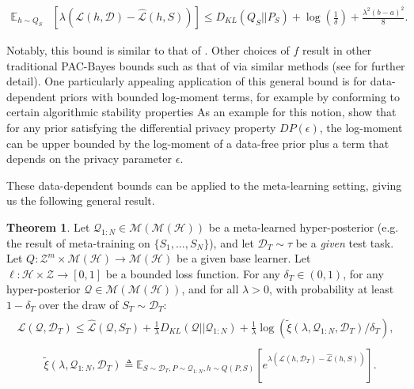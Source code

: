 \documentclass{article} %
\theoremstyle{definition}
\newtheorem{theorem}{Theorem}[section]
\newcommand{\Expect}[2]{\mathbb{E}_{#1}\left [#2 \right ]}
\begin{document}
\begin{align} 
    \mathbb{E}_{h\sim Q_S}&\left [\lambda(\mathcal{L}(h,\mathcal{D})-\hat{\mathcal{L}}(h, S))\right ]
     \leq D_{KL}(Q_S||P_S) \nonumber
    +\log\left (\frac{1}{\delta}\right ) + \frac{\lambda^2(b-a)^2}{8} .
\end{align}

Notably, this bound is similar to that of \citet{Catoni2004}. Other choices of $f$ result in other traditional PAC-Bayes bounds such as that of \citet{Mcallester} via similar methods (see \citet{Rivasplata2020} for further detail). 
One particularly appealing application of this general bound is for data-dependent priors with bounded log-moment terms, for example by conforming to certain algorithmic stability properties 
As an example for this notion, \citet{Rivasplata2020} show that for any prior satisfying the differential privacy property $DP(\epsilon)$, the log-moment can be upper bounded by the log-moment of a data-free prior plus a term that depends on the privacy parameter $\epsilon$. 

These data-dependent bounds can be applied to the meta-learning setting, giving us the following general result. 
%
\begin{theorem} \label{thm:main-result}
	Let $\mathcal{Q}_{1:N}\in \mathcal{M}(\mathcal{M}(\mathcal{H}))$ be a meta-learned hyper-posterior (e.g. the result of meta-training on $\{S_1,...,S_N\}$), and let $\mathcal{D}_T\sim \tau$ be a \emph{given} test task. Let $Q: \mathcal{Z}^m\times\mathcal{M}(\mathcal{H})\rightarrow \mathcal{M}(\mathcal{H})$ be a given base learner. Let $\ell: \mathcal{H}\times \mathcal{Z}\rightarrow [0, 1]$ be a bounded loss function.
	For any $\delta_T \in (0,1)$, for any hyper-posterior $\mathcal{Q}\in \mathcal{M}(\mathcal{M}(\mathcal{H}))$, and for all $\lambda>0$, with probability at least $1-\delta_T$ over the draw of $S_T\sim \mathcal{D}_T$:
	\begin{align} \label{eq:main-result-generic}
	\begin{split}
	\mathcal{L}(\mathcal{Q}, \mathcal{D}_T) \leq \hat{\mathcal{L}}(\mathcal{Q}, S_T) + \frac{1}{\lambda}D_{KL}(\mathcal{Q}||\mathcal{Q}_{1:N})
	+\frac{1}{\lambda}\log\left ( \tilde{\xi}(\lambda,\mathcal{Q}_{1:N},\mathcal{D}_T)/\delta_T\right ) ,
	\end{split}
	\end{align}
%
	\begin{align*} 
	\begin{split}
	&\tilde{\xi}(\lambda,\mathcal{Q}_{1:N},\mathcal{D}_T)\triangleq 
	 \Expect{S\sim \mathcal{D}_T, P\sim \mathcal{Q}_{1:N}, h\sim Q(P,S)}{e^{\lambda\left (\mathcal{L}(h, \mathcal{D}_T)-\hat{\mathcal{L}}(h, S)\right )}} .
	\end{split}
	\end{align*}
	

\end{theorem}
\end{document}
